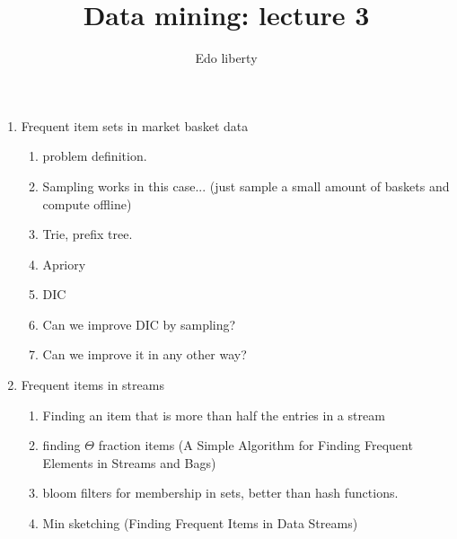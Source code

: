 \documentclass{article}
\title{Data mining: lecture 3} %
\author{Edo liberty}
\date{\nonumber}
\begin{document}
\maketitle
\begin{enumerate}
\item Frequent item sets in market basket data
\begin{enumerate}
\item problem definition.
\item Sampling works in this case... (just sample a small amount of baskets and compute offline)
\item Trie, prefix tree.
\item Apriory 
\item DIC
\item Can we improve DIC by sampling?
\item Can we improve it in any other way?
\end{enumerate}
\item Frequent items in streams
\begin{enumerate}
\item Finding an item that is more than half the entries in a stream
\item finding $\Theta$ fraction items (A Simple Algorithm for Finding Frequent  Elements in Streams and Bags)
\item bloom filters for membership in sets, better than hash functions.
\item Min sketching (Finding Frequent Items in Data Streams)
\end{enumerate}

\end{enumerate}
\end{document}
